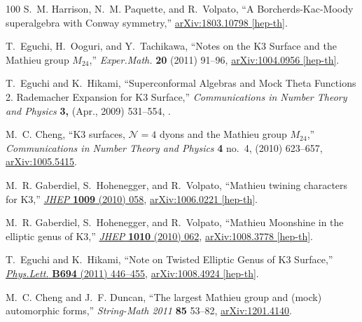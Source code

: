 \documentclass[11pt,a4paper,fontset=windows]{ctexart}
\numberwithin{equation}{section}
\begin{document}
\begin{thebibliography}{100}
S.~M. Harrison, N.~M. Paquette, and R.~Volpato, ``{A Borcherds-Kac-Moody
  superalgebra with Conway symmetry},''
\href{http://arxiv.org/abs/1803.10798}{{\ttfamily arXiv:1803.10798 [hep-th]}}.

T.~Eguchi, H.~Ooguri, and Y.~Tachikawa, ``{Notes on the K3 Surface and the
  Mathieu group $M_{24}$},'' {\em Exper.Math.} {\bfseries 20} (2011) 91--96,
\href{http://arxiv.org/abs/1004.0956}{{\ttfamily arXiv:1004.0956 [hep-th]}}.

T.~Eguchi and K.~Hikami, ``{Superconformal Algebras and Mock Theta Functions 2.
  Rademacher Expansion for K3 Surface},'' {\em Communications in Number Theory
  and Physics} {\bfseries 3,} (Apr., 2009) 531--554,
  \href{http://arxiv.org/abs/0904.0911}{{}}.

M.~C. Cheng, ``K3 surfaces, $\mathcal{N}= 4$ dyons and the {M}athieu group $
  {M_{24}} $,'' {\em Communications in Number Theory and Physics} {\bfseries 4}
  no.~4, (2010) 623--657,
  \href{http://arxiv.org/abs/arXiv:1005.5415}{{\ttfamily arXiv:1005.5415}}.

M.~R. Gaberdiel, S.~Hohenegger, and R.~Volpato, ``{Mathieu twining characters
  for K3},'' \href{http://dx.doi.org/10.1007/JHEP09(2010)058}{{\em JHEP}
  {\bfseries 1009} (2010) 058},
\href{http://arxiv.org/abs/1006.0221}{{\ttfamily arXiv:1006.0221 [hep-th]}}.

M.~R. Gaberdiel, S.~Hohenegger, and R.~Volpato, ``{Mathieu Moonshine in the
  elliptic genus of K3},''
  \href{http://dx.doi.org/10.1007/JHEP10(2010)062}{{\em JHEP} {\bfseries 1010}
  (2010) 062},
\href{http://arxiv.org/abs/1008.3778}{{\ttfamily arXiv:1008.3778 [hep-th]}}.

T.~Eguchi and K.~Hikami, ``{Note on Twisted Elliptic Genus of K3 Surface},''
  \href{http://dx.doi.org/10.1016/j.physletb.2010.10.017}{{\em Phys.Lett.}
  {\bfseries B694} (2011) 446--455},
\href{http://arxiv.org/abs/1008.4924}{{\ttfamily arXiv:1008.4924 [hep-th]}}.

M.~C. Cheng and J.~F. Duncan, ``The largest {M}athieu group and (mock)
  automorphic forms,'' {\em String-Math 2011} {\bfseries 85} 53--82,
  \href{http://arxiv.org/abs/arXiv:1201.4140}{{\ttfamily arXiv:1201.4140}}.


\end{thebibliography}
\end{document}
